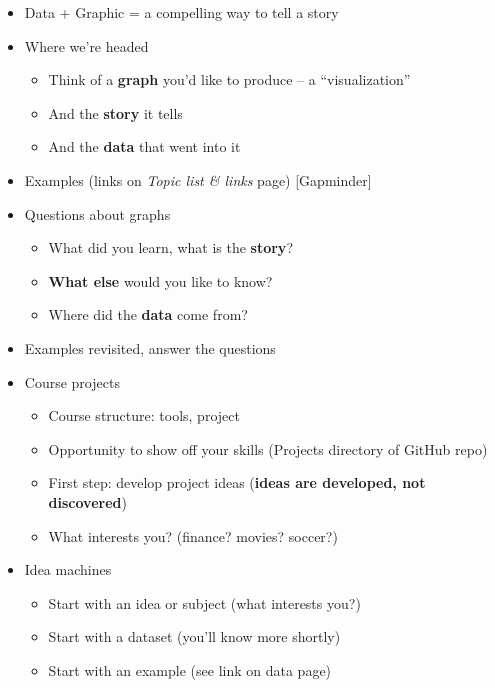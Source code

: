 \documentclass[11pt]{article}
\begin{document}
\begin{itemize}

\item Data + Graphic = a compelling way to tell a story

\item Where we're headed
\begin{itemize}
\item Think of a {\bf graph\/} you'd like to produce -- a ``visualization''
\item And the {\bf story\/} it tells
\item And the {\bf data\/} that went into it
\end{itemize}

\item Examples (links on {\it Topic list \& links\/} page) [Gapminder]

\item Questions about graphs
\begin{itemize}
\item What did you learn, what is the {\bf story\/}?
\item {\bf What else} would you like to know?
\item Where did the {\bf data\/} come from?
\end{itemize}

\item Examples revisited, answer the questions

\item Course projects
\begin{itemize}
\item Course structure:  tools, project
\item Opportunity to show off your skills (Projects directory of GitHub repo)
\item First step:  develop project ideas ({\bf ideas are developed, not discovered})
\item What interests {you}? (finance? movies?  soccer?) 
\end{itemize}

\item Idea machines
\begin{itemize}
\item Start with an idea or subject (what interests you?)   
\item Start with a dataset (you'll know more shortly) 
\item Start with an example (see link on data page) 
\end{itemize}


\end{itemize}
\end{document}
